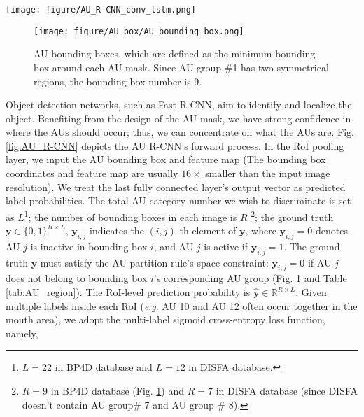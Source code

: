 \documentclass[5p,twocolumn]{elsarticle}
\newcommand{\eg}{\textit{e}.\textit{g}. }
\begin{document}
\begin{figure*}[t]
	\centering
	\texttt{[image: figure/AU\_R-CNN\_conv\_lstm.png]}
	\caption{AU R-CNN integrated with ConvLSTM architecture, where $N$ denotes mini-batch size; $T$ denotes the frames to process in each iteration; $R$ denotes AU bounding box number; $C$, $H$, and $W$ denotes the ConvLSTM's output channel number, height and width respectively. \#class denotes the AU category number we wish to discriminate. }
	\label{fig:AR_conv_lstm}
\end{figure*}
\begin{figure}[h]
	\setlength{\abovecaptionskip}{0pt}
	\setlength{\abovecaptionskip}{0pt}
	
	\texttt{[image: figure/AU\_box/AU\_bounding\_box.png]}
	
	\caption{AU bounding boxes, which are defined as the minimum bounding box around each AU mask. Since AU group \#1 has two symmetrical regions, the bounding box number is 9.}
	\label{fig:AU_bounding_box}
\end{figure}
Object detection networks, such as Fast R-CNN, aim to identify and localize the object. Benefiting from the design of the AU mask, we have strong confidence in where the AUs should occur; thus, we can concentrate on what the AUs are. Fig. \ref{fig:AU_R-CNN} depicts the AU R-CNN's forward process. In the RoI pooling layer, we input the AU bounding box and feature map (The bounding box coordinates and feature map are usually $16\times$ smaller than the input image resolution). We treat the last fully connected layer's output vector as predicted label probabilities. The total AU category number we wish to discriminate is set as $L$\footnote{$L=22$ in BP4D database and $L=12$ in DISFA database.}; the number of bounding boxes in each image is $R$ \footnote{$R=9$ in BP4D database (Fig. \ref{fig:AU_bounding_box}) and $R=7$ in DISFA database (since DISFA doesn't contain AU group\# 7 and AU group \# 8).}; the ground truth  $\mathbf{y} \in 
\{0,1\}^{R\times L}$, $\mathbf{y}_{i,j}$ indicates the $(i,j)$-th element of $\mathbf{y}$, where $\mathbf{y}_{i,j} = 0$ denotes AU $j$ is inactive in bounding box $i$, and AU $j$ is active if $\mathbf{y}_{i,j} = 1$. The ground truth $\mathbf{y}$ must satisfy the AU partition rule's space constraint: $\mathbf{y}_{i,j} = 0$ if AU $j$ does not belong to bounding box $i$'s corresponding AU group (Fig. \ref{fig:AU_bounding_box} and Table \ref{tab:AU_region}). The RoI-level prediction probability is $\hat{\mathbf{y}} \in \mathbb{R}^{R\times L}$. Given multiple labels inside each RoI (\eg AU 10 and AU 12 often occur together in the mouth area), we adopt the multi-label sigmoid cross-entropy loss function, namely,
\end{document}
